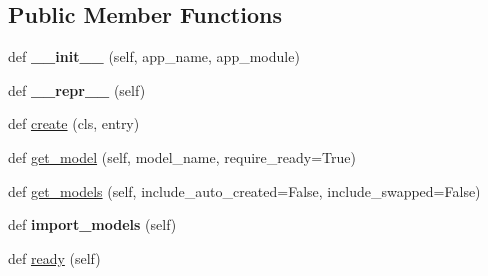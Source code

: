 \subsection*{Public Member Functions}
\begin{DoxyCompactItemize}
\item 
\mbox{\label{classdjango_1_1apps_1_1config_1_1_app_config_a547c4e2d2e66dab865022445e61c1682}} 
def {\bfseries \+\_\+\+\_\+init\+\_\+\+\_\+} (self, app\+\_\+name, app\+\_\+module)
\item 
\mbox{\label{classdjango_1_1apps_1_1config_1_1_app_config_a68a99ed9f6867ef0b04640b21c90d150}} 
def {\bfseries \+\_\+\+\_\+repr\+\_\+\+\_\+} (self)
\item 
def \mbox{\hyperlink{classdjango_1_1apps_1_1config_1_1_app_config_a4808be5261e41382a924b42d7ef621c3}{create}} (cls, entry)
\item 
def \mbox{\hyperlink{classdjango_1_1apps_1_1config_1_1_app_config_a22cba3076a57f4574727c391baa33149}{get\+\_\+model}} (self, model\+\_\+name, require\+\_\+ready=True)
\item 
def \mbox{\hyperlink{classdjango_1_1apps_1_1config_1_1_app_config_afbe7787100949feb80bba6e2e9a92353}{get\+\_\+models}} (self, include\+\_\+auto\+\_\+created=False, include\+\_\+swapped=False)
\item 
\mbox{\label{classdjango_1_1apps_1_1config_1_1_app_config_a02a6378425aa9fb435770db6d8b149b0}} 
def {\bfseries import\+\_\+models} (self)
\item 
def \mbox{\hyperlink{classdjango_1_1apps_1_1config_1_1_app_config_ad5bacbb21829def59d64ab6c4fd23e7d}{ready}} (self)
\end{DoxyCompactItemize}
